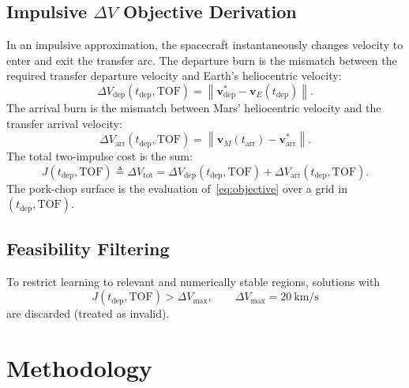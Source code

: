 \documentclass[conference]{IEEEtran}
\begin{document}
	\subsection{Impulsive $\Delta V$ Objective Derivation}
	In an impulsive approximation, the spacecraft instantaneously changes velocity to enter and exit the transfer arc. The departure burn is the mismatch between the required transfer departure velocity and Earth’s heliocentric velocity:
	\begin{equation}
		\Delta V_{\mathrm{dep}}(t_{\mathrm{dep}},\mathrm{TOF})
		= \left\|\mathbf{v}^{\ast}_{\mathrm{dep}} - \mathbf{v}_E(t_{\mathrm{dep}})\right\|.
		\label{eq:dvdep}
	\end{equation}
	The arrival burn is the mismatch between Mars’ heliocentric velocity and the transfer arrival velocity:
	\begin{equation}
		\Delta V_{\mathrm{arr}}(t_{\mathrm{dep}},\mathrm{TOF})
		= \left\|\mathbf{v}_M(t_{\mathrm{arr}}) - \mathbf{v}^{\ast}_{\mathrm{arr}}\right\|.
		\label{eq:dvarr}
	\end{equation}
	The total two-impulse cost is the sum:
	\begin{equation}
		J(t_{\mathrm{dep}},\mathrm{TOF})
		\triangleq \Delta V_{\mathrm{tot}}
		= \Delta V_{\mathrm{dep}}(t_{\mathrm{dep}},\mathrm{TOF})
		+ \Delta V_{\mathrm{arr}}(t_{\mathrm{dep}},\mathrm{TOF}).
		\label{eq:objective}
	\end{equation}
	The pork-chop surface is the evaluation of~\eqref{eq:objective} over a grid in $(t_{\mathrm{dep}},\mathrm{TOF})$.
	
	\subsection{Feasibility Filtering}
	To restrict learning to relevant and numerically stable regions, solutions with
	\begin{equation}
		J(t_{\mathrm{dep}},\mathrm{TOF}) > \Delta V_{\max}, \qquad \Delta V_{\max}=20~\text{km/s}
		\label{eq:feas}
	\end{equation}
	are discarded (treated as invalid).
	
	\section{Methodology}
\end{document}
